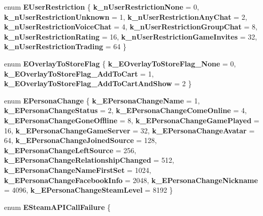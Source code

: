 \begin{DoxyCompactItemize}
enum {\bfseries E\+User\+Restriction} \{ \newline
{\bfseries k\+\_\+n\+User\+Restriction\+None} = 0, 
{\bfseries k\+\_\+n\+User\+Restriction\+Unknown} = 1, 
{\bfseries k\+\_\+n\+User\+Restriction\+Any\+Chat} = 2, 
{\bfseries k\+\_\+n\+User\+Restriction\+Voice\+Chat} = 4, 
\newline
{\bfseries k\+\_\+n\+User\+Restriction\+Group\+Chat} = 8, 
{\bfseries k\+\_\+n\+User\+Restriction\+Rating} = 16, 
{\bfseries k\+\_\+n\+User\+Restriction\+Game\+Invites} = 32, 
{\bfseries k\+\_\+n\+User\+Restriction\+Trading} = 64
 \}
\item 
\mbox{\label{namespace_valve_1_1_steamworks_a7a0247717abf607692b67c164630d8b7}} 
enum {\bfseries E\+Overlay\+To\+Store\+Flag} \{ {\bfseries k\+\_\+\+E\+Overlay\+To\+Store\+Flag\+\_\+\+None} = 0, 
{\bfseries k\+\_\+\+E\+Overlay\+To\+Store\+Flag\+\_\+\+Add\+To\+Cart} = 1, 
{\bfseries k\+\_\+\+E\+Overlay\+To\+Store\+Flag\+\_\+\+Add\+To\+Cart\+And\+Show} = 2
 \}
\item 
\mbox{\label{namespace_valve_1_1_steamworks_aac0b561dfd8e841c0f6f17ec1222461f}} 
enum {\bfseries E\+Persona\+Change} \{ \newline
{\bfseries k\+\_\+\+E\+Persona\+Change\+Name} = 1, 
{\bfseries k\+\_\+\+E\+Persona\+Change\+Status} = 2, 
{\bfseries k\+\_\+\+E\+Persona\+Change\+Come\+Online} = 4, 
{\bfseries k\+\_\+\+E\+Persona\+Change\+Gone\+Offline} = 8, 
\newline
{\bfseries k\+\_\+\+E\+Persona\+Change\+Game\+Played} = 16, 
{\bfseries k\+\_\+\+E\+Persona\+Change\+Game\+Server} = 32, 
{\bfseries k\+\_\+\+E\+Persona\+Change\+Avatar} = 64, 
{\bfseries k\+\_\+\+E\+Persona\+Change\+Joined\+Source} = 128, 
\newline
{\bfseries k\+\_\+\+E\+Persona\+Change\+Left\+Source} = 256, 
{\bfseries k\+\_\+\+E\+Persona\+Change\+Relationship\+Changed} = 512, 
{\bfseries k\+\_\+\+E\+Persona\+Change\+Name\+First\+Set} = 1024, 
{\bfseries k\+\_\+\+E\+Persona\+Change\+Facebook\+Info} = 2048, 
\newline
{\bfseries k\+\_\+\+E\+Persona\+Change\+Nickname} = 4096, 
{\bfseries k\+\_\+\+E\+Persona\+Change\+Steam\+Level} = 8192
 \}
\item 
\mbox{\label{namespace_valve_1_1_steamworks_a0a1b9cce64b56560f7f83044b9c4f824}} 
enum {\bfseries E\+Steam\+A\+P\+I\+Call\+Failure} \{ \newline

\end{DoxyCompactItemize}
